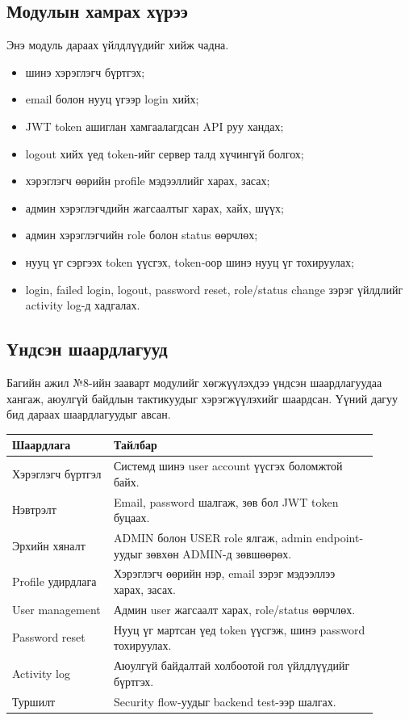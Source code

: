 \documentclass[12pt,a4paper]{article}
\begin{document}
\subsection{Модулын хамрах хүрээ}

Энэ модуль дараах үйлдлүүдийг хийж чадна.

\begin{itemize}
  \item шинэ хэрэглэгч бүртгэх;
  \item email болон нууц үгээр login хийх;
  \item JWT token ашиглан хамгаалагдсан API руу хандах;
  \item logout хийх үед token-ийг сервер талд хүчингүй болгох;
  \item хэрэглэгч өөрийн profile мэдээллийг харах, засах;
  \item админ хэрэглэгчдийн жагсаалтыг харах, хайх, шүүх;
  \item админ хэрэглэгчийн role болон status өөрчлөх;
  \item нууц үг сэргээх token үүсгэх, token-оор шинэ нууц үг тохируулах;
  \item login, failed login, logout, password reset, role/status change зэрэг үйлдлийг activity log-д хадгалах.
\end{itemize}

\subsection{Үндсэн шаардлагууд}

Багийн ажил №8-ийн зааварт модулийг хөгжүүлэхдээ үндсэн шаардлагуудаа хангаж, аюулгүй байдлын тактикуудыг хэрэгжүүлэхийг шаардсан. Үүний дагуу бид дараах шаардлагуудыг авсан.

\begin{longtable}{p{0.25\linewidth} p{0.65\linewidth}}
\toprule
\textbf{Шаардлага} & \textbf{Тайлбар} \\
\midrule
Хэрэглэгч бүртгэл & Системд шинэ user account үүсгэх боломжтой байх. \\
Нэвтрэлт & Email, password шалгаж, зөв бол JWT token буцаах. \\
Эрхийн хяналт & ADMIN болон USER role ялгаж, admin endpoint-уудыг зөвхөн ADMIN-д зөвшөөрөх. \\
Profile удирдлага & Хэрэглэгч өөрийн нэр, email зэрэг мэдээллээ харах, засах. \\
User management & Админ user жагсаалт харах, role/status өөрчлөх. \\
Password reset & Нууц үг мартсан үед token үүсгэж, шинэ password тохируулах. \\
Activity log & Аюулгүй байдалтай холбоотой гол үйлдлүүдийг бүртгэх. \\
Туршилт & Security flow-уудыг backend test-ээр шалгах. \\
\bottomrule
\end{longtable}
\end{document}
